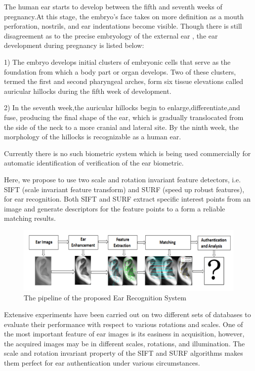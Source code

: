 The human ear starts to develop between the fifth and seventh weeks of pregnancy.At this stage, the embryo’s face takes on more definition as a mouth perforation, nostrils, and ear indentations become visible. Though there is still disagreement as to the precise embryology of the external ear , the ear development during pregnancy is listed below:

 
1) The embryo develops initial clusters of embryonic cells that serve as the foundation from which a body part or organ develops. Two of these clusters, termed the first and second pharyngeal arches, form six tissue elevations called auricular hillocks during the fifth week of development. 

2) In the seventh week,the auricular hillocks begin to enlarge,differentiate,and fuse, producing the final shape of the ear, which is gradually translocated from the side of the neck to a more cranial and lateral site. By the ninth week, the morphology of the hillocks is recognizable as a human ear.

Currently there is no such biometric system which is being used commercially for automatic identification of verification of the ear biometric.

Here, we propose to use two scale and rotation invariant feature detectors, i.e. SIFT (scale invariant feature transform) and SURF (speed up robust features), for ear recognition. Both SIFT and SURF extract specific interest points from an image and generate descriptors for the feature points to a form a reliable matching results.\\
\begin{figure}[t]
	\includegraphics[width=\textwidth]{Figures/Figure1}
	\caption{The pipeline of the proposed Ear Recognition System}
	\label{fig:Figure1}
\end{figure}
Extensive experiments have been carried out on two different sets of databases to evaluate their performance with respect to various rotations and scales. One of the most important feature of ear images is its easiness in acquisition, however, the acquired images may be in different scales, rotations, and illumination. The scale and rotation invariant property of the SIFT and SURF algorithms makes them perfect for ear authentication under various circumstances.

